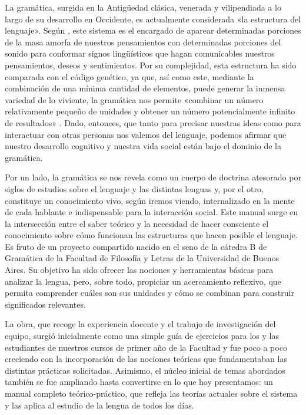 
La gramática, surgida en la Antigüedad clásica, venerada y vilipendiada a lo
largo de su desarrollo en Occidente, es actualmente considerada «la estructura
del lenguaje». Según \textcite{saussure1945}, este sistema es el encargado de
aparear determinadas porciones de la masa amorfa de nuestros pensamientos con
determinadas porciones del sonido para conformar signos lingüísticos que hagan
comunicables nuestros pensamientos, deseos y sentimientos. Por su complejidad,
esta estructura ha sido comparada con el código genético, ya que, así como este,
mediante la combinación de una mínima cantidad de elementos, puede generar la
inmensa variedad de lo viviente, la gramática nos permite «combinar un número
relativamente pequeño de unidades y obtener un número potencialmente infinito de
resultados» \parencite[18]{bosque2009}. Dado, entonces, que tanto para precisar
nuestras ideas como para interactuar con otras personas nos valemos del
lenguaje, podemos afirmar que nuestro desarrollo cognitivo y nuestra vida social
están bajo el dominio de la gramática.

Por un lado, la gramática se nos revela como un cuerpo de doctrina atesorado por
siglos de estudios sobre el lenguaje y las distintas lenguas y, por el otro,
constituye un conocimiento vivo, según iremos viendo, internalizado en la mente
de cada hablante \parencite{chomsky1957} e indispensable para la interacción
social. Este manual surge en la intersección entre el saber teórico y la
necesidad de hacer consciente el conocimiento sobre cómo funcionan las
estructuras que hacen posible el lenguaje. Es fruto de un proyecto compartido
nacido en el seno de la cátedra B de Gramática de la Facultad de Filosofía y
Letras de la Universidad de Buenos Aires. Su objetivo ha sido ofrecer las
nociones y herramientas básicas para analizar la lengua, pero, sobre todo,
propiciar un acercamiento reflexivo, que permita comprender cuáles son sus
unidades y cómo se combinan para construir significados relevantes.

La obra, que recoge la experiencia docente y el trabajo de investigación del
equipo, surgió inicialmente como una simple guía de ejercicios para los y las
estudiantes de nuestros cursos de primer año de la Facultad y fue poco a poco
creciendo con la incorporación de las nociones teóricas que fundamentaban las
distintas prácticas solicitadas. Asimismo, el núcleo inicial de temas abordados
también se fue ampliando hasta convertirse en lo que hoy presentamos: un manual
completo teórico-práctico, que refleja las teorías actuales sobre el sistema y
las aplica al estudio de la lengua de todos los días.

